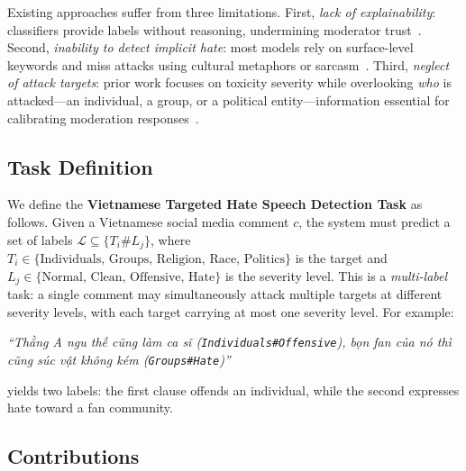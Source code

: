 \documentclass[conference]{IEEEtran}
\begin{document}
Existing approaches suffer from three limitations.
First, \textit{lack of explainability}: classifiers provide labels without
reasoning, undermining moderator trust~\cite{Mathew2021HateXplain}.
Second, \textit{inability to detect implicit hate}: most models rely on
surface-level keywords and miss attacks using cultural metaphors or
sarcasm~\cite{ElSherief2021Latent}.
Third, \textit{neglect of attack targets}: prior work focuses on toxicity
severity while overlooking \textit{who} is attacked---an individual, a group,
or a political entity---information essential for calibrating moderation
responses~\cite{Sap2020SocialBias}.

\subsection{Task Definition}

We define the \textbf{Vietnamese Targeted Hate Speech Detection Task} as
follows. Given a Vietnamese social media comment $c$, the system must predict a
set of labels $\mathcal{L} \subseteq \{T_i\texttt{\#}L_j\}$, where $T_i \in
\{\text{Individuals, Groups, Religion, Race, Politics}\}$ is the target and
$L_j \in \{\text{Normal, Clean, Offensive, Hate}\}$ is the severity level. This
is a \textit{multi-label} task: a single comment may simultaneously attack
multiple targets at different severity levels, with each target carrying at most
one severity level. For example:

\smallskip
\noindent\foreignlanguage{vietnamese}{\textit{``Thằng A ngu thế cũng làm ca sĩ
(\texttt{Individuals\#Offensive}), bọn fan của nó thì cũng súc vật không kém
(\texttt{Groups\#Hate})''}}
\smallskip

\noindent yields two labels: the first clause offends an individual, while the
second expresses hate toward a fan community.

\subsection{Contributions}
\end{document}
